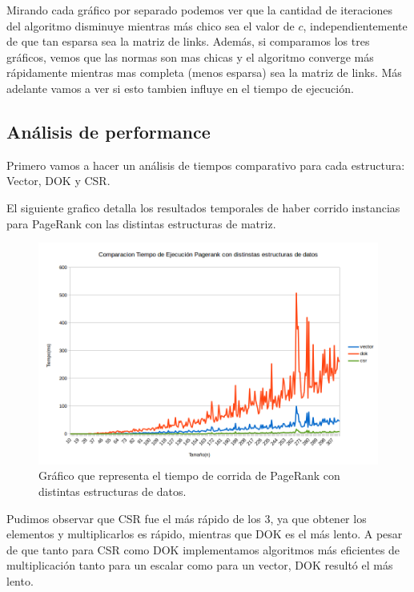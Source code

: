 Mirando cada gráfico por separado podemos ver que la cantidad de iteraciones del algoritmo disminuye mientras más chico sea el valor de $c$, independientemente de que tan esparsa sea la matriz de links. 
Además, si comparamos los tres gráficos, vemos que las normas son mas chicas y el algoritmo converge más rápidamente mientras mas completa (menos esparsa) sea la matriz de links. Más adelante vamos a ver si esto tambien influye en el tiempo de ejecución.\\

\newpage

\subsection{Análisis de performance}

Primero vamos a hacer un análisis de tiempos comparativo para cada estructura: Vector, DOK y CSR.

El siguiente grafico detalla los resultados temporales de haber corrido instancias para PageRank con las distintas estructuras de matriz. 

\begin{figure}[h]
   \begin{center}
     \includegraphics[scale=0.6]{imagenes/comparacion-tiempo-ejecucion-csr-dok-vector.png}
   \end{center}
   \caption{Gráfico que representa el tiempo de corrida de PageRank con distintas estructuras de datos.}
  \label{fig:img7}
\end{figure}

Pudimos observar que CSR fue el más rápido de los 3, ya que obtener los elementos y multiplicarlos es rápido, mientras que DOK es el más lento. A pesar de que tanto para CSR como DOK implementamos algoritmos más eficientes de multiplicación tanto para un escalar como para un vector, DOK resultó el más lento. \\

